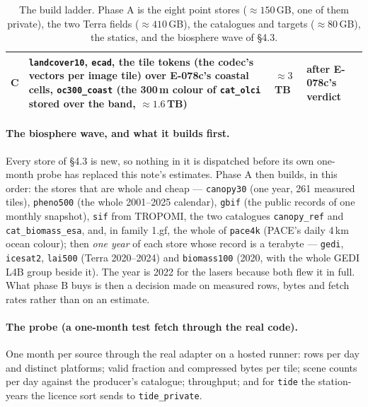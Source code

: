 \documentclass[10pt]{article}
\newcommand{\code}[1]{\texttt{#1}}
\begin{document}
\begin{table}[H]
\begin{tabular}{@{}L{1.4cm}L{8.6cm}L{1.6cm}L{3.4cm}@{}}
\addlinespace
C & \code{landcover10}, \code{ecad}, the tile tokens (the codec's vectors per image tile) over E-078c's coastal cells, \code{oc300\_coast} (the 300\,m colour of \code{cat\_olci} stored over the band, $\approx 1.6$\,TB) & $\approx 3$\,TB & after E-078c's verdict \\
\bottomrule
\end{tabular}
\caption{The build ladder. Phase A is the eight point stores ($\approx 150$\,GB, one of them private), the two Terra fields ($\approx 410$\,GB), the catalogues and targets ($\approx 80$\,GB), the statics, and the biosphere wave of \S4.3.}
\end{table}

\paragraph{The biosphere wave, and what it builds first.} Every store of
\S4.3 is new, so nothing in it is dispatched before its own one-month probe
has replaced this note's estimates. Phase A then builds, in this order: the
stores that are whole and cheap --- \code{canopy30} (one year, 261 measured
tiles), \code{pheno500} (the whole 2001--2025 calendar), \code{gbif} (the
public records of one monthly snapshot), \code{sif} from TROPOMI, the two
catalogues \code{canopy\_ref} and \code{cat\_biomass\_esa}, and, in family
1.gf, the whole of \code{pace4k} (PACE's daily 4\,km ocean colour); then
\emph{one year} of each store whose record is a terabyte --- \code{gedi},
\code{icesat2}, \code{lai500} (Terra 2020--2024) and \code{biomass100}
(2020, with the whole GEDI L4B group beside it). The year is 2022 for the
lasers because both flew it in full. What phase B buys is then a decision
made on measured rows, bytes and fetch rates rather than on an estimate.

\paragraph{The probe (a one-month test fetch through the real code).} One month per source through the real adapter on a
hosted runner: rows per day and distinct platforms; valid fraction and
compressed bytes per tile; scene counts per day against the producer's
catalogue; throughput; and for \code{tide} the station-years the licence sort
sends to \code{tide\_private}.
\end{document}
